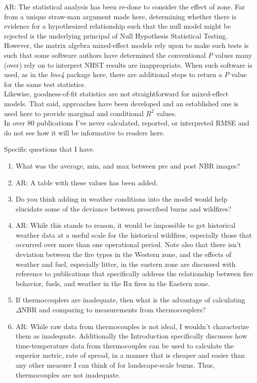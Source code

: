 \documentclass[parskip=half, american]{scrartcl}
\newcommand{\AR}[1]
	{\color{PineGreen}AR: #1\color{black} \par }
\begin{document}
\AR{The statistical analysis has been re-done to consider the effect of zone. 
	Far from a unique straw-man argument made here, determining whether there is evidence for a hypothesized relationship such that the null model might be rejected is the underlying principal of Null Hypothesis Statistical Testing. 
	However, the matrix algebra mixed-effect models rely upon to make such tests is such that some software authors have determined the conventional $P$ values many (over) rely on to interpret NHST results are inappropriate. 
	When such software is used, as in the \emph{lme4} package here, there are additional steps to return a $P$ value for the same test statistics. 
	\\
	Likewise, goodness-of-fit statistics are not straightforward for mixed-effect models. 
	That said, approaches have been developed and an established one is used here to provide marginal and conditional $R^2$ values. 
	\\
	In over 80 publications I've never calculated, reported, or interpreted RMSE and do not see how it will be informative to readers here. }

Specific questions that I have.

\begin{enumerate} 
\item What was the average, min, and max between pre and post NBR images?
\item[] \AR{ A table with these values has been added. }

\item Do you think adding in weather conditions into the model would help elucidate some of the deviance between prescribed burns and wildfires?

\item[] \AR{While this stands to reason, it would be impossible to get historical weather data at a useful scale for the historical wildfires, especially those that occurred over more than one operational period. 
Note also that there isn't deviation between the fire types in the Western zone, and the effects of weather and fuel, especially litter, in the eastern zone are discussed with reference to publications that specifically address the relationship between fire behavior, fuels, and weather in the Rx fires in the Eastern zone. }

\item If thermocouplers are inadequate, then what is the advantage of calculating $\Delta$NBR and comparing to measurements from thermocouplers?

\item[] \AR{While raw data from thermocouples is not ideal, I wouldn't characterize them as inadequate. 
	Additionally the Introduction specifically discusses how time-temperature data from thermocouples can be used to calculate the superior metric, rate of spread, in a manner that is cheaper and easier than any other measure I can think of for landscape-scale burns. 
	Thus, thermocouples are not inadequate. } 
\end{enumerate}
\end{document}
